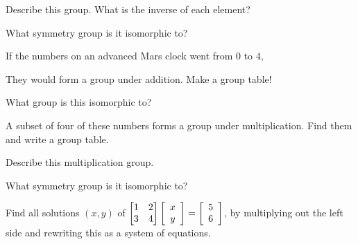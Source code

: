\documentclass[../gatm_answers.tex]{subfiles}
\begin{document}
\begin{inner_problem}
\item Describe this group. What is the inverse of each element?
\end{inner_problem}

\begin{inner_problem}
\item What symmetry group is it isomorphic to?
\end{inner_problem}

\begin{outer_problem}
\item If the numbers on an advanced Mars clock went from $0$ to $4$,
\end{outer_problem}

\begin{inner_problem}[start=1]
\item They would form a group under addition. Make a group table!
\end{inner_problem}

\begin{inner_problem}
\item What group is this isomorphic to?
\end{inner_problem}

\begin{inner_problem}
\item A subset of four of these numbers forms a group under multiplication. Find them and write a group table.
\end{inner_problem}

\begin{inner_problem}
\item Describe this multiplication group.
\end{inner_problem}

\begin{inner_problem}
\item What symmetry group is it isomorphic to?
\end{inner_problem}

\begin{outer_problem}
\item
\end{outer_problem}

\begin{inner_problem}[start=1]
\item \label{prob:needed_for_matrix_undo3}Find all solutions $(x,y)$ of $\begin{bmatrix} 1 & 2 \\ 3 & 4 \end{bmatrix}\left[\begin{array}{c} x \\ y \end{array}\right]=\left[\begin{array}{c} 5 \\ 6 \end{array}\right]$, by multiplying out the left side and rewriting this as a system of equations.
\end{inner_problem}
\end{document}
